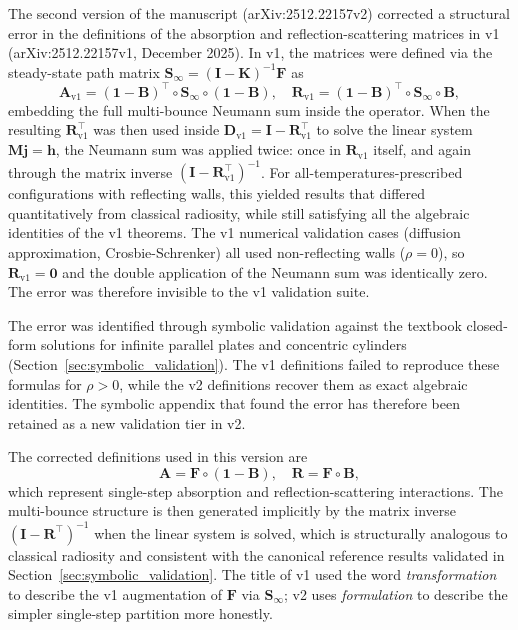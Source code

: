 \documentclass[preprint,1p,times]{elsarticle}
\theoremstyle{plain}
\theoremstyle{definition}
\theoremstyle{remark}
\begin{document}
The second version of the manuscript (arXiv:2512.22157v2) corrected a structural error in the definitions of the absorption and reflection-scattering matrices in v1 (arXiv:2512.22157v1, December 2025). In v1, the matrices were defined via the steady-state path matrix $\mathbf{S}_\infty = (\mathbf{I} - \mathbf{K})^{-1}\mathbf{F}$ as
\begin{equation*}
\mathbf{A}_{\text{v1}} = (\mathbf{1}-\mathbf{B})^\top \circ \mathbf{S}_\infty \circ (\mathbf{1}-\mathbf{B}),
\quad
\mathbf{R}_{\text{v1}} = (\mathbf{1}-\mathbf{B})^\top \circ \mathbf{S}_\infty \circ \mathbf{B},
\end{equation*}
embedding the full multi-bounce Neumann sum inside the operator. When the resulting $\mathbf{R}_{\text{v1}}^\top$ was then used inside $\mathbf{D}_{\text{v1}} = \mathbf{I} - \mathbf{R}_{\text{v1}}^\top$ to solve the linear system $\mathbf{M}\mathbf{j} = \mathbf{h}$, the Neumann sum was applied twice: once in $\mathbf{R}_{\text{v1}}$ itself, and again through the matrix inverse $(\mathbf{I} - \mathbf{R}_{\text{v1}}^\top)^{-1}$. For all-temperatures-prescribed configurations with reflecting walls, this yielded results that differed quantitatively from classical radiosity, while still satisfying all the algebraic identities of the v1 theorems. The v1 numerical validation cases (diffusion approximation, Crosbie-Schrenker) all used non-reflecting walls ($\rho=0$), so $\mathbf{R}_{\text{v1}} = \mathbf{0}$ and the double application of the Neumann sum was identically zero. The error was therefore invisible to the v1 validation suite.

The error was identified through symbolic validation against the textbook closed-form solutions for infinite parallel plates and concentric cylinders (Section~\ref{sec:symbolic_validation}). The v1 definitions failed to reproduce these formulas for $\rho > 0$, while the v2 definitions recover them as exact algebraic identities. The symbolic appendix that found the error has therefore been retained as a new validation tier in v2.

The corrected definitions used in this version are
\begin{equation*}
\mathbf{A} = \mathbf{F} \circ (\mathbf{1}-\mathbf{B}),
\quad
\mathbf{R} = \mathbf{F} \circ \mathbf{B},
\end{equation*}
which represent single-step absorption and reflection-scattering interactions. The multi-bounce structure is then generated implicitly by the matrix inverse $(\mathbf{I} - \mathbf{R}^\top)^{-1}$ when the linear system is solved, which is structurally analogous to classical radiosity and consistent with the canonical reference results validated in Section~\ref{sec:symbolic_validation}. The title of v1 used the word \textit{transformation} to describe the v1 augmentation of $\mathbf{F}$ via $\mathbf{S}_\infty$; v2 uses \textit{formulation} to describe the simpler single-step partition more honestly.
\end{document}
